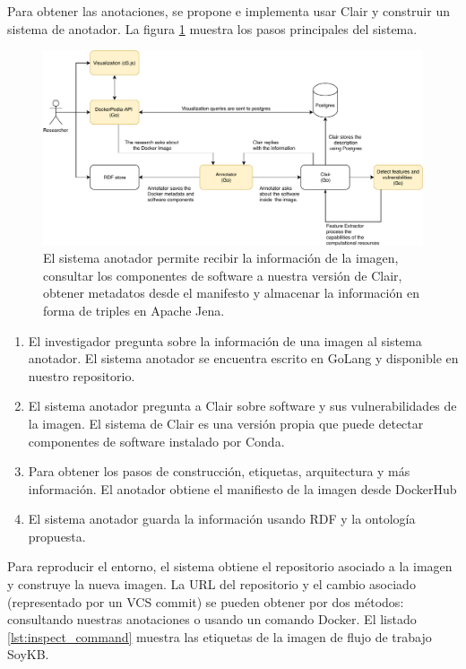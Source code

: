 Para obtener las anotaciones, se propone e implementa usar Clair y construir un sistema de anotador. La figura \ref{fig:arch} muestra los pasos principales del sistema.

\begin{figure}[t]
\includegraphics[width=\textwidth]{Figures/arch.pdf}
\caption[Arquitectura sistema anotador]{El sistema anotador permite recibir la información de la imagen, consultar los componentes de software a nuestra versión de Clair, obtener metadatos desde el manifesto y almacenar la información en forma de triples en Apache Jena.}\label{fig:arch}
\end{figure}


\begin{enumerate}
    \item El investigador pregunta sobre la información de una imagen al sistema anotador. El sistema anotador se encuentra escrito en GoLang y disponible en nuestro repositorio.
    \item El sistema anotador pregunta a Clair sobre software y sus vulnerabilidades de la imagen. El sistema de Clair es una versión propia que puede detectar componentes de software instalado por Conda.
    \item Para obtener los pasos de construcción, etiquetas, arquitectura y más información. El anotador obtiene el manifiesto de la imagen desde DockerHub
    \item El sistema anotador guarda la información usando RDF y la ontología propuesta.
\end{enumerate}


Para reproducir el entorno, el sistema obtiene el repositorio asociado a la imagen y construye la nueva imagen. La URL del repositorio y el cambio asociado (representado por un VCS commit) se pueden obtener por dos métodos: consultando nuestras anotaciones o usando un comando Docker. El listado \ref{lst:inspect_command} muestra las etiquetas de la imagen de flujo de trabajo SoyKB.

